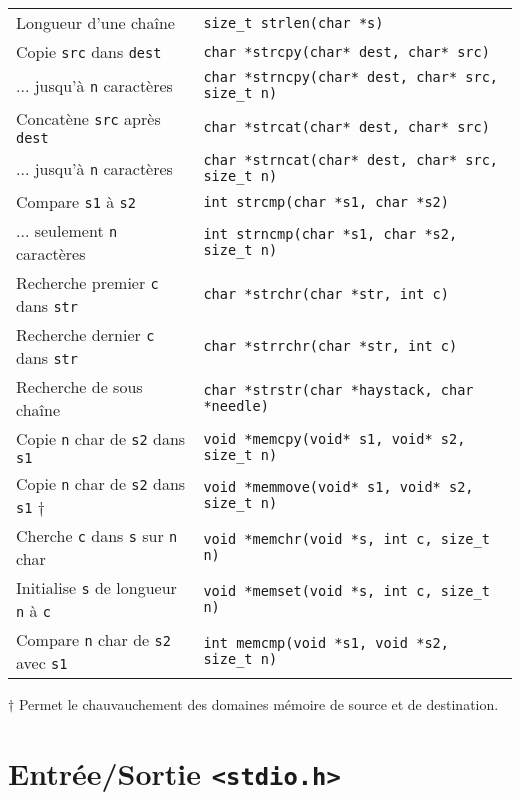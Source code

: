 \documentclass{article}
\newcommand{\cd}{\lstinline}
\begin{document}
\begin{multicols*}{3}
\begin{tabularx}{\linewidth}{Xl}
  Longueur d'une chaîne & \cd{size_t strlen(char *s)} \\
  Copie \texttt{src} dans \texttt{dest} & \cd{char *strcpy(char* dest, char* src)} \\
   ... jusqu'à \texttt{n} caractères & \cd{char *strncpy(char* dest, char* src, size_t n)} \\
  \hline
  Concatène \texttt{src} après \texttt{dest} & \cd{char *strcat(char* dest, char* src)} \\
   ... jusqu'à \texttt{n} caractères & \cd{char *strncat(char* dest, char* src, size_t n)} \\
  Compare \texttt{s1} à \texttt{s2} & \cd{int strcmp(char *s1, char *s2)} \\
   ... seulement \texttt{n} caractères & \cd{int strncmp(char *s1, char *s2, size_t n)} \\
  \hline
  Recherche premier \texttt{c} dans \texttt{str} & \cd{char *strchr(char *str, int c)} \\
  Recherche dernier \texttt{c} dans \texttt{str} & \cd{char *strrchr(char *str, int c)} \\
  Recherche de sous chaîne & \cd{char *strstr(char *haystack, char *needle)} \\
  \hline
  Copie \texttt{n} char de \texttt{s2} dans \texttt{s1} & \cd{void *memcpy(void* s1, void* s2, size_t n)} \\
  Copie \texttt{n} char de \texttt{s2} dans \texttt{s1} $\dagger$ & \cd{void *memmove(void* s1, void* s2, size_t n)} \\
  Cherche \texttt{c} dans \texttt{s} sur \texttt{n} char & \cd{void *memchr(void *s, int c, size_t n)} \\
  Initialise \texttt{s} de longueur \texttt{n} à \texttt{c} & \cd{void *memset(void *s, int c, size_t n)} \\
  Compare \texttt{n} char de \texttt{s2} avec \texttt{s1} & \cd{int memcmp(void *s1, void *s2, size_t n)} \\
\end{tabularx}

$\dagger$ Permet le chauvauchement des domaines mémoire de source et de destination.

\section*{Entrée/Sortie \texttt{<stdio.h>}}

\begin{tabularx}{\linewidth}{
  >{\hsize=0.5\hsize}X%
  >{\hsize=1.5\hsize}X%
  >{\hsize=0.5\hsize}X%
  >{\hsize=1.5\hsize}X%
  }


\end{tabularx}
\end{multicols*}
\end{document}
